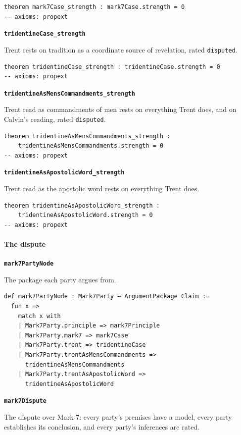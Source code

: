 \documentclass[11pt]{article}
\begin{document}
{\small\begin{verbatim}
theorem mark7Case_strength : mark7Case.strength = 0
-- axioms: propext
\end{verbatim}}
\par\medskip\noindent\textbf{\texttt{tridentine\allowbreak{}Case\_\allowbreak{}strength}}\par\nobreak\noindent
Trent rests on tradition as a coordinate source of revelation, rated \texttt{disputed}.

{\small\begin{verbatim}
theorem tridentineCase_strength : tridentineCase.strength = 0
-- axioms: propext
\end{verbatim}}
\par\medskip\noindent\textbf{\texttt{tridentine\allowbreak{}As\allowbreak{}Mens\allowbreak{}Commandments\_\allowbreak{}strength}}\par\nobreak\noindent
Trent read as commandments of men rests on everything Trent does, and on Calvin’s reading, rated \texttt{disputed}.

{\small\begin{verbatim}
theorem tridentineAsMensCommandments_strength :
    tridentineAsMensCommandments.strength = 0
-- axioms: propext
\end{verbatim}}
\par\medskip\noindent\textbf{\texttt{tridentine\allowbreak{}As\allowbreak{}Apostolic\allowbreak{}Word\_\allowbreak{}strength}}\par\nobreak\noindent
Trent read as the apostolic word rests on everything Trent does.

{\small\begin{verbatim}
theorem tridentineAsApostolicWord_strength :
    tridentineAsApostolicWord.strength = 0
-- axioms: propext
\end{verbatim}}
\paragraph*{The dispute}
\leavevmode\par\nobreak
\par\medskip\noindent\textbf{\texttt{mark7\allowbreak{}Party\allowbreak{}Node}}\par\nobreak\noindent
The package each party argues from.

{\small\begin{verbatim}
def mark7PartyNode : Mark7Party → ArgumentPackage Claim :=
  fun x =>
    match x with
    | Mark7Party.principle => mark7Principle
    | Mark7Party.mark7 => mark7Case
    | Mark7Party.trent => tridentineCase
    | Mark7Party.trentAsMensCommandments =>
      tridentineAsMensCommandments
    | Mark7Party.trentAsApostolicWord =>
      tridentineAsApostolicWord
\end{verbatim}}
\par\medskip\noindent\textbf{\texttt{mark7\allowbreak{}Dispute}}\par\nobreak\noindent
The dispute over Mark 7: every party’s premises have a model, every party establishes its conclusion, and every party’s inferences are rated.
\end{document}
